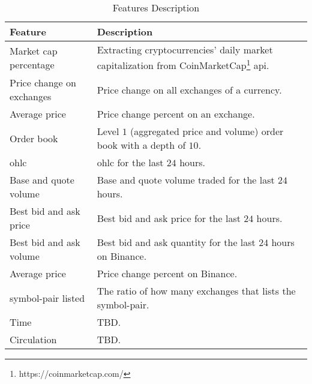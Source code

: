 \begin{table}[ht]
    \centering
    \begin{tabular}{p{} p{}}
        \hline
        \textbf{Feature} & \textbf{Description}\\
        \hline
        Market cap percentage       & Extracting cryptocurrencies' daily market capitalization from CoinMarketCap\footnote{https://coinmarketcap.com/} \ac{api}.\\
        \hline
        Price change on exchanges   & Price change on all exchanges of a currency.\\
        \hline
        Average price               & Price change percent on an exchange.\\
        \hline
        Order book                  & Level $1$ (aggregated price and volume) order book with a depth of $10$.\\
        \hline
        \acs{ohlc}                  & \ac{ohlc} for the last $24$ hours.\\
        \hline
        Base and quote volume       & Base and quote volume traded for the last $24$ hours. \\
        \hline
        Best bid and ask price      & Best bid and ask price for the last $24$ hours.\\
        \hline
        Best bid and ask volume     & Best bid and ask quantity for the last $24$ hours on Binance. \\
        \hline
        Average price               & Price change percent on Binance.\\
        \hline
        symbol-pair listed          & The ratio of how many exchanges that lists the symbol-pair.\\ 
        \hline
        Time                        & TBD.\\
        \hline
        Circulation                 & TBD.\\
        \hline
    \end{tabular}
    \caption{Features Description}
    \label{tab:features}
\end{table}